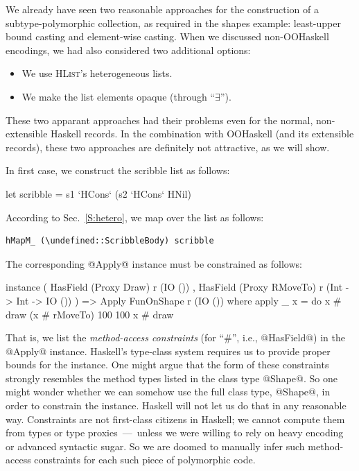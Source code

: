 \documentclass{jfp}
\newcommand{\HList}{\textsc{HList}}
\newcommand{\undefined}{\ensuremath{\bot}}
\begin{document}
We already have seen two reasonable approaches for the construction of
a subtype-polymorphic collection, as required in the shapes example:
least-upper bound casting and element-wise casting. When we discussed
non-OOHaskell encodings, we had also considered two additional options:
%
\begin{itemize}
\item We use \HList's heterogeneous lists.
\item We make the list elements opaque (through ``$\exists$'').
\end{itemize}
%
These two apparant approaches had their problems even for the normal,
non-extensible Haskell records. In the combination with OOHaskell (and
its extensible records), these two approaches are definitely not
attractive, as we will show.

In first case, we construct the scribble list as follows:

\begin{code}
 let scribble = s1 `HCons` (s2 `HCons` HNil)
\end{code}

According to Sec.~\ref{S:hetero}, we map over the list as follows:

\begin{Verbatim}[fontsize=\small,commandchars=\\\{\}]
 hMapM_ (\undefined::ScribbleBody) scribble
\end{Verbatim}

The corresponding @Apply@ instance must be constrained as follows:

\begin{code}
instance ( HasField (Proxy Draw) r (IO ())
         , HasField (Proxy RMoveTo) r (Int -> Int -> IO ())
         )
      => Apply FunOnShape r (IO ())
  where
    apply _ x = do
                   x # draw
                   (x # rMoveTo) 100 100
                   x # draw
\end{code}

That is, we list the \emph{method-access constraints} (for ``\#'',
i.e., @HasField@) in the @Apply@ instance. Haskell's type-class system
requires us to provide proper bounds for the instance. One might argue
that the form of these constraints strongly resembles the method types
listed in the class type @Shape@. So one might wonder whether we can
somehow use the full class type, @Shape@, in order to constrain the
instance.  Haskell will not let us do that in any reasonable
way. Constraints are not first-class citizens in Haskell; we cannot
compute them from types or type proxies~---~unless we were willing to
rely on heavy encoding or advanced syntactic sugar. So we are doomed
to manually infer such method-access constraints for each such piece
of polymorphic code.
\end{document}
